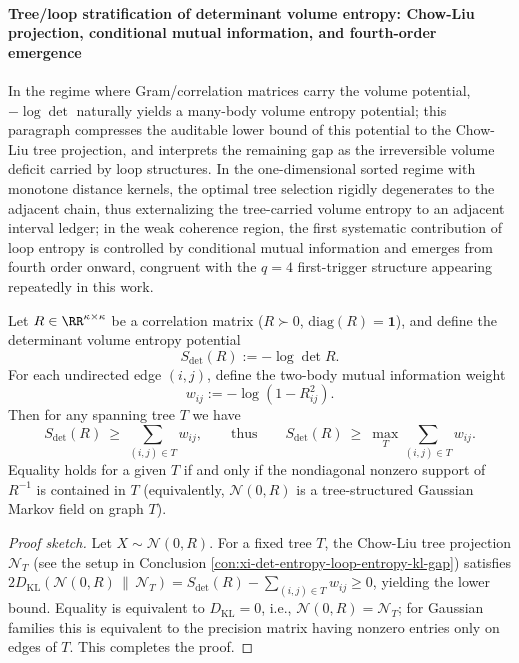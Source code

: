 %

\paragraph{Tree/loop stratification of determinant volume entropy: Chow-Liu projection, conditional mutual information, and fourth-order emergence}
In the regime where Gram/correlation matrices carry the volume potential, \(-\log\det\) naturally yields a many-body volume entropy potential;
this paragraph compresses the auditable lower bound of this potential to the Chow-Liu tree projection, and interprets the remaining gap as the irreversible volume deficit carried by loop structures.
In the one-dimensional sorted regime with monotone distance kernels, the optimal tree selection rigidly degenerates to the adjacent chain, thus externalizing the tree-carried volume entropy to an adjacent interval ledger;
in the weak coherence region, the first systematic contribution of loop entropy is controlled by conditional mutual information and emerges from fourth order onward, congruent with the \(q=4\) first-trigger structure appearing repeatedly in this work.

\begin{conclusion}\label{con:xi-det-entropy-chow-liu-tree-lower-bound}
Let \(R\in\RR^{\kappa\times\kappa}\) be a correlation matrix (\(R\succ0\), \(\mathrm{diag}(R)=\mathbf 1\)), and define the determinant volume entropy potential
\[
S_{\det}(R):=-\log\det R.
\]
For each undirected edge \((i,j)\), define the two-body mutual information weight
\[
w_{ij}:=-\log(1-R_{ij}^2).
\]
Then for any spanning tree \(T\) we have
\[
S_{\det}(R)\ \ge\ \sum_{(i,j)\in T} w_{ij},
\qquad\text{thus}\qquad
S_{\det}(R)\ \ge\ \max_{T}\sum_{(i,j)\in T} w_{ij}.
\]
Equality holds for a given \(T\) if and only if the nondiagonal nonzero support of \(R^{-1}\) is contained in \(T\) (equivalently, \(\mathcal N(0,R)\) is a tree-structured Gaussian Markov field on graph \(T\)).
\end{conclusion}
\begin{proof}[Proof sketch]
Let \(X\sim\mathcal N(0,R)\).
For a fixed tree \(T\), the Chow-Liu tree projection \(\mathcal N_T\) (see the setup in Conclusion \ref{con:xi-det-entropy-loop-entropy-kl-gap}) satisfies
\(
2D_{\mathrm{KL}}(\mathcal N(0,R)\,\|\,\mathcal N_T)
=S_{\det}(R)-\sum_{(i,j)\in T}w_{ij}\ge 0
\),
yielding the lower bound.
Equality is equivalent to \(D_{\mathrm{KL}}=0\), i.e., \(\mathcal N(0,R)=\mathcal N_T\);
for Gaussian families this is equivalent to the precision matrix having nonzero entries only on edges of \(T\). This completes the proof.
\end{proof}

